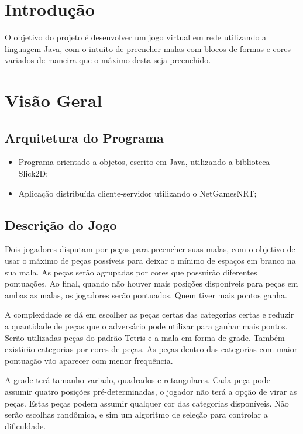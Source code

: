 \documentclass[
	12pt,	
	openany,			
	oneside,			
	a4paper,			
	english,			
	french,			
	spanish,			
	brazil,	
	]{abntex2}
\begin{document}
 
\frenchspacing
\imprimircapa

\tableofcontents*
\cleardoublepage
\textual

\chapter*[Introdução]{Introdução}
 
O objetivo do projeto é desenvolver um jogo virtual em rede utilizando a linguagem Java, 
com o intuito de preencher malas com blocos de formas e cores variados de maneira que o máximo desta seja preenchido.

\chapter{Visão Geral}
 
\section{Arquitetura do Programa}
\begin{itemize}
\item Programa orientado a objetos, escrito em Java, utilizando a biblioteca Slick2D;
\item Aplicação distribuída cliente-servidor utilizando o NetGamesNRT;
\end{itemize}

\section{Descrição do Jogo}

Dois jogadores disputam por peças para preencher suas malas, com o objetivo de usar o máximo de peças possíveis para deixar o mínimo de espaços em branco na sua mala. As peças serão agrupadas por cores que possuirão diferentes pontuações. Ao final, quando não houver mais posições disponíveis para peças em ambas as malas, os jogadores serão pontuados. Quem tiver mais pontos ganha.

A complexidade se dá em escolher as peças certas das categorias certas e reduzir a quantidade de peças que o adversário pode utilizar para ganhar mais pontos. Serão utilizadas peças do padrão Tetris e a mala em forma de grade. Também existirão categorias por cores de peças. As peças dentro das categorias com maior pontuação vão aparecer com menor frequência.

A grade terá tamanho variado, quadrados e retangulares. Cada peça pode assumir quatro posições pré-determinadas, o jogador não terá a opção de virar as peças. Estas peças podem assumir qualquer cor das categorias disponíveis. Não serão escolhas randômica, e sim um algoritmo de seleção para controlar a dificuldade.
\end{document}
